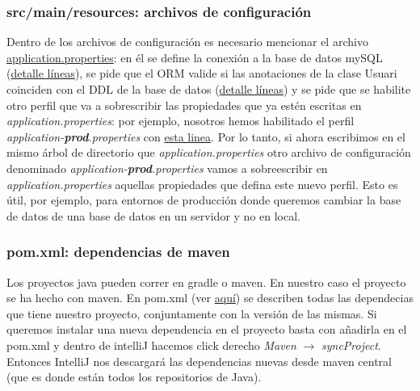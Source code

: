 \documentclass[a4paper,12pt]{report}
\begin{document}
				
				
				
				
				\subsubsection{src/main/resources: archivos de configuración}
				
				Dentro de los archivos de configuración es necesario mencionar el archivo \href{https://github.com/blackcub3s/mercApp/blob/main/APP%20WEB/__springboot__produccio__/app/src/main/resources/application.properties}{application.properties}: en él se define la conexión a la base de datos mySQL (\href{https://github.com/blackcub3s/mercApp/blob/69c9dffc3a959f9b19b43eaf13236ba99250878e/APP%20WEB/__springboot__produccio__/app/src/main/resources/application.properties#L5-L9}{detalle líneas}), se pide que el ORM valide si las anotaciones de la clase Usuari coinciden con el DDL de la base de datos (\href{https://github.com/blackcub3s/mercApp/blob/69c9dffc3a959f9b19b43eaf13236ba99250878e/APP%20WEB/__springboot__produccio__/app/src/main/resources/application.properties#L13}{detalle líneas}) y se pide que se habilite otro perfil que va a sobrescribir las propiedades que ya estén escritas en \textit{application.properties}: por ejemplo, nosotros hemos habilitado el perfil \textit{application-\textbf{prod}.properties} con \href{https://github.com/blackcub3s/mercApp/blob/69c9dffc3a959f9b19b43eaf13236ba99250878e/APP%20WEB/__springboot__produccio__/app/src/main/resources/application.properties#L26}{esta linea}. Por lo tanto, si ahora escribimos en el mismo árbol de directorio que \textit{application.properties} otro archivo de configuración denominado \textit{application-\textbf{prod}.properties} vamos a sobreescribir en \textit{application.properties} aquellas propiedades que defina este nuevo perfil. Esto es útil, por ejemplo, para entornos de producción donde queremos cambiar la base de datos de una base de datos en un servidor y no en local.
				
				\subsubsection{pom.xml: dependencias de maven}
				
				Los proyectos java pueden correr en gradle o maven. En nuestro caso el proyecto se ha hecho con maven. En pom.xml (ver \href{https://github.com/blackcub3s/mercApp/blob/main/APP%20WEB/__springboot__produccio__/app/src/main/resources/application.properties}{aquí}) se describen todas las dependecias que tiene nuestro proyecto, conjuntamente con la versión de las mismas. Si queremos instalar una nueva dependencia en el proyecto basta con añadirla en el pom.xml y dentro de intelliJ hacemos click derecho \textit{Maven} $\rightarrow$ \textit{syncProject}. Entonces IntelliJ nos descargará las dependencias nuevas desde maven central (que es donde están todos los repositorios de Java).
				
\end{document}
